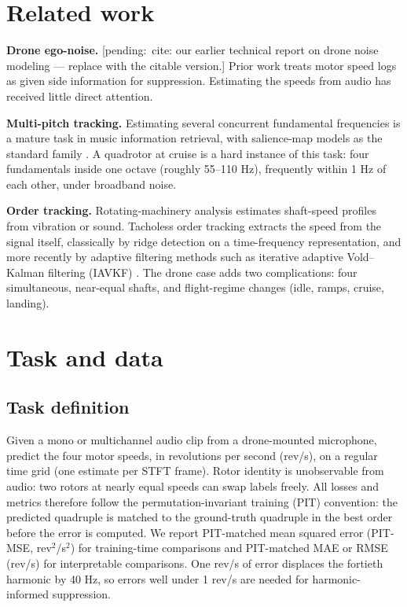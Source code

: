 \documentclass[journal]{IEEEtran}
\newcommand{\pending}[1]{{\color{gray}\textsf{[pending:~#1]}}}
\begin{document}
\section{Related work}
\label{sec:related}

\textbf{Drone ego-noise.} \cite{strauss2018dregon,wang2020bss,yen2023ncm,%
wang2020dnntf,mukhlish2023survey,liu2025edgebsrof,gulli2025rotorcond}
\pending{cite: our earlier technical report on drone noise modeling ---
replace with the citable version.} Prior work treats motor speed logs as given side
information for suppression. Estimating the speeds from audio has received
little direct attention.

\textbf{Multi-pitch tracking.} Estimating several concurrent fundamental
frequencies is a mature task in music information retrieval, with
salience-map models as the standard family
\cite{bittner2017deepsalience,cuesta2020multif0,bittner2022basicpitch}. A quadrotor at cruise is a hard instance
of this task: four fundamentals inside one octave (roughly 55--110 Hz),
frequently within 1 Hz of each other, under broadband noise.

\textbf{Order tracking.} Rotating-machinery analysis estimates shaft-speed
profiles from vibration or sound. Tacholess order tracking extracts the
speed from the signal itself, classically by ridge detection on a
time-frequency representation, and more recently by adaptive filtering
methods such as iterative adaptive Vold--Kalman filtering (IAVKF)
\cite{peeters2019tacholess,iatsenko2016ridges,jiang2024iavkf}. The drone case adds two complications: four simultaneous,
near-equal shafts, and flight-regime changes (idle, ramps, cruise, landing).

\section{Task and data}
\label{sec:task}

\subsection{Task definition}
\label{sec:task-def}

Given a mono or multichannel audio clip from a drone-mounted microphone,
predict the four motor speeds, in revolutions per second (rev/s), on a
regular time grid (one estimate per STFT frame). Rotor identity is
unobservable from audio: two rotors at nearly equal speeds can swap labels
freely. All losses and metrics therefore follow the permutation-invariant
training (PIT) convention: the predicted quadruple is matched to the
ground-truth quadruple in the best order before the error is computed. We
report PIT-matched mean squared error (PIT-MSE, rev$^2$/s$^2$) for
training-time comparisons and PIT-matched MAE or RMSE (rev/s) for
interpretable comparisons. One rev/s of error displaces the fortieth
harmonic by 40 Hz, so errors well under 1 rev/s are needed for
harmonic-informed suppression.
\end{document}
